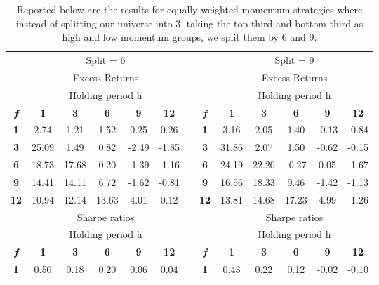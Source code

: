 \documentclass{article}
\begin{document}
\begin{table}[htb!]
  \centering
  \caption{Reported below are the results for equally weighted momentum strategies where instead of splitting our universe into 3, taking the top third and bottom third as high and low momentum groups, we split them by 6 and 9.}
    \begin{tabular}{ccccccccccccc}
    \toprule
          & \multicolumn{5}{c}{Split = 6}         &       &       & \multicolumn{5}{c}{Split = 9} \\
          & \multicolumn{5}{c}{Excess Returns}    &       &       & \multicolumn{5}{c}{Excess Returns} \\
\cmidrule{2-6}\cmidrule{9-13}          & \multicolumn{5}{c}{Holding period h}  &       &       & \multicolumn{5}{c}{Holding period h} \\
    \textit{\textbf{f}} & \textbf{1} & \textbf{3} & \textbf{6} & \textbf{9} & \textbf{12} &       & \textit{\textbf{f}} & \textbf{1} & \textbf{3} & \textbf{6} & \textbf{9} & \textbf{12} \\
\cmidrule{2-6}\cmidrule{9-13}    \textbf{1} & 2.74  & 1.21  & 1.52  & 0.25  & 0.26  &       & \textbf{1} & 3.16  & 2.05  & 1.40  & -0.13 & -0.84 \\
    \textbf{3} & 25.09 & 1.49  & 0.82  & -2.49 & -1.85 &       & \textbf{3} & 31.86 & 2.07  & 1.50  & -0.62 & -0.15 \\
    \textbf{6} & 18.73 & 17.68 & 0.20  & -1.39 & -1.16 &       & \textbf{6} & 24.19 & 22.20 & -0.27 & 0.05  & -1.67 \\
    \textbf{9} & 14.41 & 14.11 & 6.72  & -1.62 & -0.81 &       & \textbf{9} & 16.56 & 18.33 & 9.46  & -1.42 & -1.13 \\
    \textbf{12} & 10.94 & 12.14 & 13.63 & 4.01  & 0.12  &       & \textbf{12} & 13.81 & 14.68 & 17.23 & 4.99  & -1.26 \\
    \midrule
          & \multicolumn{5}{c}{Sharpe ratios}     &       &       & \multicolumn{5}{c}{Sharpe ratios} \\
    \midrule
          & \multicolumn{5}{c}{Holding period h}  &       &       & \multicolumn{5}{c}{Holding period h} \\
    \textit{\textbf{f}} & \textbf{1} & \textbf{3} & \textbf{6} & \textbf{9} & \textbf{12} &       & \textit{\textbf{f}} & \textbf{1} & \textbf{3} & \textbf{6} & \textbf{9} & \textbf{12} \\
\cmidrule{2-6}\cmidrule{9-13}    \textbf{1} & 0.50  & 0.18  & 0.20  & 0.06  & 0.04  &       & \textbf{1} & 0.43  & 0.22  & 0.12  & -0.02 & -0.10 \\

\end{tabular}
\end{table}
\end{document}
